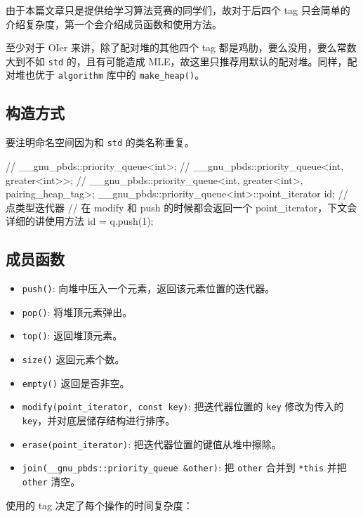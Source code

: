 由于本篇文章只是提供给学习算法竞赛的同学们，故对于后四个 tag 只会简单的介绍复杂度，第一个会介绍成员函数和使用方法。

至少对于 OIer 来讲，除了配对堆的其他四个 tag 都是鸡肋，要么没用，要么常数大到不如 \texttt{std} 的，且有可能造成 MLE，故这里只推荐用默认的配对堆。同样，配对堆也优于 \texttt{algorithm} 库中的 \texttt{make\_heap()}。

\subsection{构造方式}\label{ux6784ux9020ux65b9ux5f0f}

要注明命名空间因为和 \texttt{std} 的类名称重复。


\begin{codeline}
// __gnu_pbds::priority_queue<int>;
// __gnu_pbds::priority_queue<int, greater<int>>;
// __gnu_pbds::priority_queue<int, greater<int>, pairing_heap_tag>;
__gnu_pbds::priority_queue<int>::point_iterator id;  // 点类型迭代器
// 在 modify 和 push 的时候都会返回一个 point_iterator，下文会详细的讲使用方法
id = q.push(1);
\end{codeline}


\subsection{成员函数}\label{ux6210ux5458ux51fdux6570-5}

\begin{itemize}
\tightlist
\item
  \texttt{push()}: 向堆中压入一个元素，返回该元素位置的迭代器。
\item
  \texttt{pop()}: 将堆顶元素弹出。
\item
  \texttt{top()}: 返回堆顶元素。
\item
  \texttt{size()} 返回元素个数。
\item
  \texttt{empty()} 返回是否非空。
\item
  \texttt{modify(point\_iterator,\ const\ key)}: 把迭代器位置的 \texttt{key} 修改为传入的 \texttt{key}，并对底层储存结构进行排序。
\item
  \texttt{erase(point\_iterator)}: 把迭代器位置的键值从堆中擦除。
\item
  \texttt{join(\_\_gnu\_pbds::priority\_queue\ \&other)}: 把 \texttt{other} 合并到 \texttt{*this} 并把 \texttt{other} 清空。
\end{itemize}

使用的 tag 决定了每个操作的时间复杂度：

